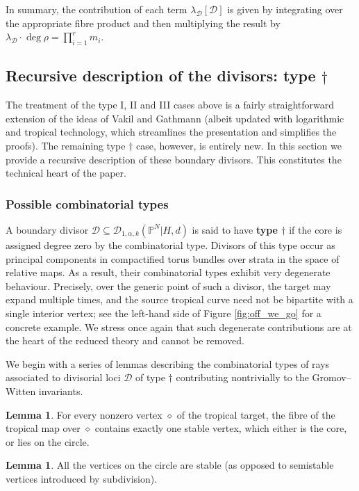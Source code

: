 \documentclass[11pt]{amsart}
\newcommand{\PP}{\mathbb P}
\newcommand{\Dcal}{\mathcal{D}}
\theoremstyle{definition}
\newtheorem{lemma}[thm]{Lemma}
\theoremstyle{definition}
\begin{document}
In summary, the contribution of each term $\lambda_\Dcal [\Dcal]$ is given by integrating over the appropriate fibre product and then multiplying the result by $\lambda_\Dcal \cdot \deg\rho = \prod_{i=1}^r m_i$.

\subsection{Recursive description of the divisors: type $\dag$}\label{subsection C0 splitting} The treatment of the type I, II and III cases above is a fairly straightforward extension of the ideas of Vakil and Gathmann (albeit updated with logarithmic and tropical technology, which streamlines the presentation and simplifies the proofs). The remaining type $\dag$ case, however, is entirely new. In this section we provide a recursive description of these boundary divisors. This constitutes the technical heart of the paper.

\subsubsection{Possible combinatorial types}\label{S:combinatorialdescription} A boundary divisor $\Dcal \subseteq \Dcal_{1,\alpha,k}(\PP^N|H,d)$ is said to have \textbf{type $\dag$} if the core is assigned degree zero by the combinatorial type. Divisors of this type occur as principal components in compactified torus bundles over strata in the space of relative maps. As a result, their combinatorial types exhibit very degenerate behaviour. Precisely, over the generic point of such a divisor, the target may expand multiple times, and the source tropical curve need not be bipartite with a single interior vertex; see the left-hand side of Figure \ref{fig:off_we_go} for a concrete example. We stress once again that such degenerate contributions are at the heart of the reduced theory and cannot be removed.

We begin with a series of lemmas describing the combinatorial types of rays associated to divisorial loci $\Dcal$ of type $\dag$ contributing nontrivially to the Gromov--Witten invariants.
\begin{lemma} \label{lemma type C0 combinatorial types}
 For every nonzero vertex $\diamond$ of the tropical target, the fibre of the tropical map over $\diamond$ contains exactly one stable vertex, which either is the core, or lies on the circle.
\end{lemma}

\begin{lemma}\label{lem:stable_vertices} All the vertices on the circle are stable (as opposed to semistable  vertices introduced by subdivision). \end{lemma}
\end{document}
